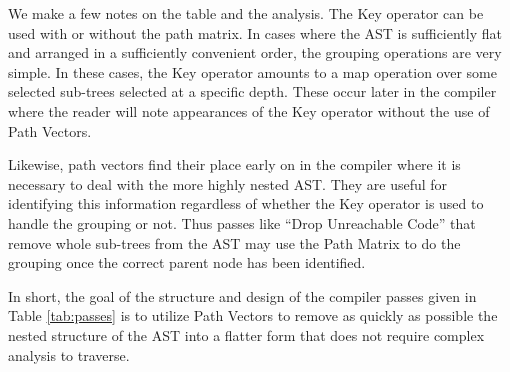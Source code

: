 ﻿\documentclass[numbers,10pt,preprint]{sigplanconf}
\begin{document}
We make a few notes on the table and the analysis. The Key operator can be used with or without the path matrix. In cases where the AST is sufficiently flat and arranged in a sufficiently convenient order, the grouping operations are very simple. In these cases, the Key operator amounts to a map operation over some selected sub-trees selected at a specific depth. These occur later in the compiler where the reader will note appearances of the Key operator without the use of Path Vectors.

Likewise, path vectors find their place early on in the compiler where it is necessary to deal with the more highly nested AST. They are useful for identifying this information regardless of whether the Key operator is used to handle the grouping or not. Thus passes like ``Drop Unreachable Code'' that remove whole sub-trees from the AST may use the Path Matrix to do the grouping once the correct parent node has been identified.

In short, the goal of the structure and design of the compiler passes given in Table \ref{tab:passes} is to utilize Path Vectors to remove as quickly as possible the nested structure of the AST into a flatter form that does not require complex analysis to traverse.
\end{document}
